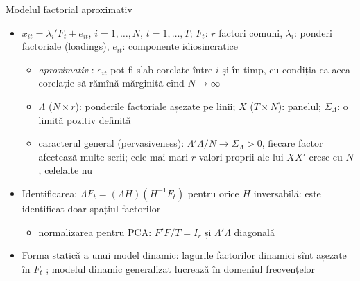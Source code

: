 \begin{frame}{Modelul factorial aproximativ}
\itemsize{\small}
\begin{itemize}
    \item $x_{it} = \lambda_i'F_t + e_{it}$, $i = 1, \dots, N$, $t = 1, \dots, T$; $F_t$: $r$ factori comuni, $\lambda_i$: ponderi factoriale (loadings), $e_{it}$: componente idiosincratice
    \begin{itemize}
        \item \emph{aproximativ} : $e_{it}$ pot fi slab corelate între $i$ și în timp, cu condiția ca acea corelație să rămînă mărginită cînd $N \to \infty$
        \item $\Lambda$ ($N\times r$): ponderile factoriale așezate pe linii; $X$ ($T\times N$): panelul; $\Sigma_\Lambda$: o limită pozitiv definită
        \item caracterul general (pervasiveness): $\Lambda'\Lambda/N \to \Sigma_\Lambda > 0$, fiecare factor afectează multe serii; cele mai mari $r$ valori proprii ale lui $XX'$ cresc cu $N$, celelalte nu
    \end{itemize}
    \item Identificarea: $\Lambda F_t = (\Lambda H)(H^{-1}F_t)$ pentru orice $H$ inversabilă: este identificat doar spațiul factorilor
    \begin{itemize}
        \item normalizarea pentru PCA: $F'F/T = I_r$ și $\Lambda'\Lambda$ diagonală
    \end{itemize}
    \item Forma statică a unui model dinamic: lagurile factorilor dinamici sînt așezate în $F_t$ ; modelul dinamic generalizat lucrează în domeniul frecvențelor 
\end{itemize}
\end{frame}

